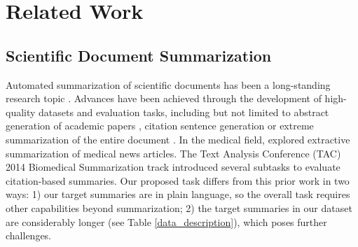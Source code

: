 \documentclass[letterpaper, table]{article} %
\begin{document}



\section{Related Work}
\subsection{Scientific Document Summarization}
Automated summarization of scientific documents has been a long-standing research topic \cite{Paice1980TheAG,teufel2002summarization}. Advances have been achieved through the development of high-quality datasets and evaluation tasks, including but not limited to abstract generation of academic papers \cite{Cohan2018ADA}, citation sentence generation \cite{Luu2020CitationTG} or extreme
summarization of the entire document \cite{Cachola2020TLDRES}. In the medical field, \citet{Sarkar2011UsingML} explored extractive summarization of medical news articles. 
The Text Analysis Conference (TAC) 2014 Biomedical Summarization track introduced several subtasks to evaluate citation-based summaries. 
Our proposed task differs from this prior work in two ways: 1) our target summaries are in plain language, so the overall task requires other capabilities beyond summarization; 
2) the target summaries in our dataset are considerably longer (see Table \ref{data_description}), which poses further challenges.
\end{document}
